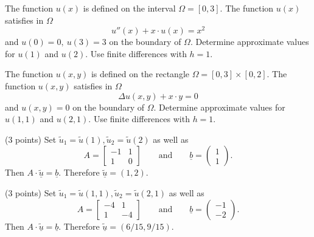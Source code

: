 \begin{teilaufgaben}
\item
The function $u(x)$ is defined on the interval $\Omega = [0,3].$ 
The function $u(x)$ satisfies in $\Omega$ 
\[
u''(x) + x \cdot u(x) = x^2
\]
and  $u(0) = 0, \ u(3) = 3$ on the boundary of $\Omega$. 
Determine approximate values for $u(1)$ and $u(2)$. Use finite differences with $h = 1$. 
\item
The function $u(x,y)$ is defined on the rectangle $\Omega = [0,3] \times [0,2].$ 
The function $u(x,y)$ satisfies in $\Omega$ 
\[
\Delta u(x,y) + x \cdot y = 0
\]
and $u(x,y) = 0$ on the boundary of $\Omega$.
Determine approximate values for $u(1,1)$ and $u(2,1)$. Use finite differences with $h = 1$. 
\end{teilaufgaben}

\begin{loesung}
\begin{teilaufgaben}
\item
(3 points)
Set $\tilde u_1 = \tilde u(1), \tilde u_2 = \tilde u(2)$
as well as
\[
A =
\left[\begin{array}{rr} -1 & 1  \\ 1 & 0  \end{array}\right]
\qquad\text{and}\qquad
\underline{b}
=
\left(\begin{array}{r} 1 \\ 1 \end{array}\right).
\]
Then $A \cdot \underline{\tilde u} = \underline{b}$.
Therefore $\underline{\tilde u} = (1,2)$.
\item
(3 points)
Set $\tilde u_1 = \tilde u(1,1), \tilde u_2 = \tilde u(2,1)$ as well as
\[
A
=
\left[\begin{array}{rr} -4 & 1  \\ 1 & -4  \end{array}\right]
\qquad\text{and}\qquad
\underline{b}
=
\left(\begin{array}{r} -1 \\ -2 \end{array}\right).
\]
Then  $A \cdot \underline{\tilde u} = \underline{b}$.
Therefore $\underline{\tilde u} = (6/15,9/15)$.
\qedhere
\end{teilaufgaben}
\end{loesung}



